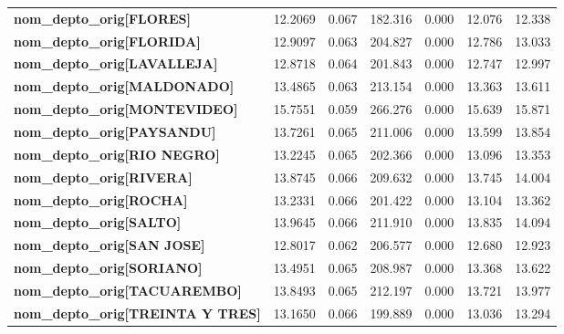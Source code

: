 \begin{center}
\begin{tabular}{lcccccc}
\textbf{nom\_depto\_orig[FLORES]}          &      12.2069  &        0.067     &   182.316  &         0.000        &       12.076    &       12.338     \\
\textbf{nom\_depto\_orig[FLORIDA]}         &      12.9097  &        0.063     &   204.827  &         0.000        &       12.786    &       13.033     \\
\textbf{nom\_depto\_orig[LAVALLEJA]}       &      12.8718  &        0.064     &   201.843  &         0.000        &       12.747    &       12.997     \\
\textbf{nom\_depto\_orig[MALDONADO]}       &      13.4865  &        0.063     &   213.154  &         0.000        &       13.363    &       13.611     \\
\textbf{nom\_depto\_orig[MONTEVIDEO]}      &      15.7551  &        0.059     &   266.276  &         0.000        &       15.639    &       15.871     \\
\textbf{nom\_depto\_orig[PAYSANDU]}        &      13.7261  &        0.065     &   211.006  &         0.000        &       13.599    &       13.854     \\
\textbf{nom\_depto\_orig[RIO NEGRO]}       &      13.2245  &        0.065     &   202.366  &         0.000        &       13.096    &       13.353     \\
\textbf{nom\_depto\_orig[RIVERA]}          &      13.8745  &        0.066     &   209.632  &         0.000        &       13.745    &       14.004     \\
\textbf{nom\_depto\_orig[ROCHA]}           &      13.2331  &        0.066     &   201.422  &         0.000        &       13.104    &       13.362     \\
\textbf{nom\_depto\_orig[SALTO]}           &      13.9645  &        0.066     &   211.910  &         0.000        &       13.835    &       14.094     \\
\textbf{nom\_depto\_orig[SAN JOSE]}        &      12.8017  &        0.062     &   206.577  &         0.000        &       12.680    &       12.923     \\
\textbf{nom\_depto\_orig[SORIANO]}         &      13.4951  &        0.065     &   208.987  &         0.000        &       13.368    &       13.622     \\
\textbf{nom\_depto\_orig[TACUAREMBO]}      &      13.8493  &        0.065     &   212.197  &         0.000        &       13.721    &       13.977     \\
\textbf{nom\_depto\_orig[TREINTA Y TRES]}  &      13.1650  &        0.066     &   199.889  &         0.000        &       13.036    &       13.294     \\

\end{tabular}
\end{center}
